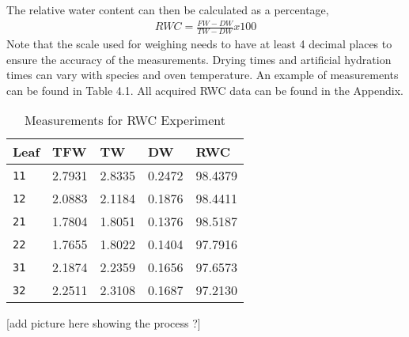 The relative water content can then be calculated as a percentage,
%
\begin{align}
    RWC = \frac{FW - DW}{TW - DW} x 100%
\end{align}
%
Note that the scale used for weighing needs to have at least 4 decimal places to ensure the accuracy of the measurements. Drying times and artificial hydration times can vary with species and oven temperature. An example of measurements can be found in Table 4.1.  All acquired RWC data can be found in the Appendix.
%
\begin{table}[htb]
  \centering
  \begin{tabular}{lllll}
    \toprule
    \textbf{Leaf} & \textbf{TFW} & \textbf{TW} & \textbf{DW} & \textbf{RWC} \\
    \midrule
      \texttt{11} & 2.7931 & 2.8335 & 0.2472 & 98.4379 \\
      \texttt{12} & 2.0883 & 2.1184 & 0.1876 & 98.4411 \\
      \texttt{21} & 1.7804 & 1.8051 & 0.1376 & 98.5187 \\
      \texttt{22} & 1.7655 & 1.8022 & 0.1404 & 97.7916 \\
      \texttt{31} & 2.1874 & 2.2359 & 0.1656 & 97.6573 \\
      \texttt{32} & 2.2511 & 2.3108 & 0.1687 & 97.2130 \\
    \bottomrule
  \end{tabular}
  \caption{%
    Measurements for RWC Experiment
  }
  \label{tab:Packages}
\end{table}
%
[add picture here showing the process ?]
